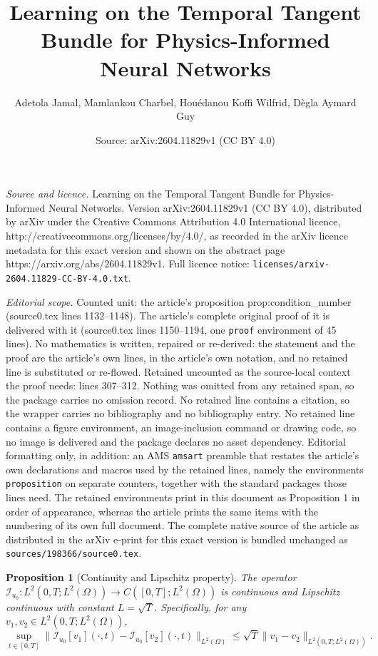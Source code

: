 \documentclass[10pt,a4paper]{amsart}
\title{Learning on the Temporal Tangent Bundle for Physics-Informed Neural Networks}
\author{Adetola Jamal, Mamlankou Charbel, Hou\'edanou Koffi Wilfrid, D\`egla Aymard Guy}
\date{Source: arXiv:2604.11829v1 (CC BY 4.0)}
\newtheorem{proposition}{Proposition}
\begin{document}
\maketitle

\noindent\emph{Source and licence.} Learning on the Temporal Tangent Bundle for Physics-Informed Neural Networks. Version arXiv:2604.11829v1 (CC BY 4.0), distributed by arXiv under the Creative Commons Attribution 4.0 International licence, http://creativecommons.org/licenses/by/4.0/, as recorded in the arXiv licence metadata for this exact version and shown on the abstract page https://arxiv.org/abs/2604.11829v1. Full licence notice: \texttt{licenses/arxiv-2604.11829-CC-BY-4.0.txt}.\par\smallskip

\noindent\textit{Editorial scope.} Counted unit: the article's proposition prop:condition\_number (source0.tex lines 1132--1148). The article's complete original proof of it is delivered with it (source0.tex lines 1150--1194, one \texttt{proof} environment of 45 lines). No mathematics is written, repaired or re-derived: the statement and the proof are the article's own lines, in the article's own notation, and no retained line is substituted or re-flowed.  Retained uncounted as the source-local context the proof needs: lines 307--312.  Nothing was omitted from any retained span, so the package carries no omission record.  No retained line contains a citation, so the wrapper carries no bibliography and no bibliography entry.  No retained line contains a figure environment, an image-inclusion command or drawing code, so no image is delivered and the package declares no asset dependency.  Editorial formatting only, in addition: an AMS \texttt{amsart} preamble that restates the article's own declarations and macros used by the retained lines, namely the environments \texttt{proposition} on separate counters, together with the standard packages those lines need.  The retained environments print in this document as Proposition 1 in order of appearance, whereas the article prints the same items with the numbering of its own full document.  The complete native source of the article as distributed in the arXiv e-print for this exact version is bundled unchanged as \texttt{sources/198366/source0.tex}.
\begin{proposition}[Continuity and Lipschitz property]\label{prop:continuity}
The operator $\mathcal{I}_{u_0}: L^2(0,T; L^2(\Omega)) \to C([0,T]; L^2(\Omega))$ is continuous and Lipschitz continuous with constant $L = \sqrt{T}$. Specifically, for any $v_1, v_2 \in L^2(0,T; L^2(\Omega))$,
\begin{equation}
    \sup_{t \in [0,T]} \|\mathcal{I}_{u_0}[v_1](\cdot,t) - \mathcal{I}_{u_0}[v_2](\cdot,t)\|_{L^2(\Omega)} \leq \sqrt{T} \|v_1 - v_2\|_{L^2(0,T; L^2(\Omega))}.
\end{equation}
\end{proposition}
\end{document}
